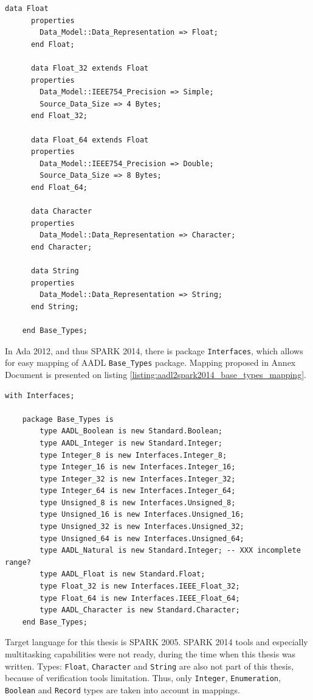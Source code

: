 \begin{lstlisting}[language=aadl, frame=single, gobble=0, caption={AADL Base\_Types package}]
	  data Float 
	  properties
	    Data_Model::Data_Representation => Float;
	  end Float;

	  data Float_32 extends Float 
	  properties 
	    Data_Model::IEEE754_Precision => Simple; 
	    Source_Data_Size => 4 Bytes; 
	  end Float_32; 

	  data Float_64 extends Float 
	  properties 
	    Data_Model::IEEE754_Precision => Double; 
	    Source_Data_Size => 8 Bytes; 
	  end Float_64;

	  data Character
	  properties
	    Data_Model::Data_Representation => Character;
	  end Character;

	  data String
	  properties
	    Data_Model::Data_Representation => String;
	  end String;

	end Base_Types;
\end{lstlisting} 
\label{listing:aadl_base_types}
\doublespacing

In Ada 2012, and thus SPARK 2014, there is package \lstinline{Interfaces}, which allows for easy mapping of AADL \lstinline{Base_Types} package. Mapping proposed in Annex Document \cite{AnnexDoc} is presented on listing \ref{listing:aadl2spark2014_base_types_mapping}.

\singlespacing
\begin{lstlisting}[language=aadl, frame=single, gobble=0, caption={Mapping of Base\_Types for SPARK 2014}]
	with Interfaces;

	package Base_Types is
		type AADL_Boolean is new Standard.Boolean;
		type AADL_Integer is new Standard.Integer;
	 	type Integer_8 is new Interfaces.Integer_8;
	 	type Integer_16 is new Interfaces.Integer_16;
		type Integer_32 is new Interfaces.Integer_32;
		type Integer_64 is new Interfaces.Integer_64;
		type Unsigned_8 is new Interfaces.Unsigned_8;
		type Unsigned_16 is new Interfaces.Unsigned_16;
		type Unsigned_32 is new Interfaces.Unsigned_32;
		type Unsigned_64 is new Interfaces.Unsigned_64;
		type AADL_Natural is new Standard.Integer; -- XXX incomplete range? 
		type AADL_Float is new Standard.Float;
		type Float_32 is new Interfaces.IEEE_Float_32;
		type Float_64 is new Interfaces.IEEE_Float_64;
	  	type AADL_Character is new Standard.Character;
	end Base_Types;
\end{lstlisting} 
\label{listing:aadl2spark2014_base_types_mapping}
\doublespacing

Target language for this thesis is SPARK 2005. SPARK 2014 tools and especially multitasking capabilities were not ready, during the time when this thesis was written. Types: \lstinline{Float}, \lstinline{Character} and \lstinline{String} are also not part of this thesis, because of verification tools limitation. Thus, only \lstinline{Integer}, \lstinline{Enumeration}, \lstinline{Boolean} and \lstinline{Record} types are taken into account in mappings.

